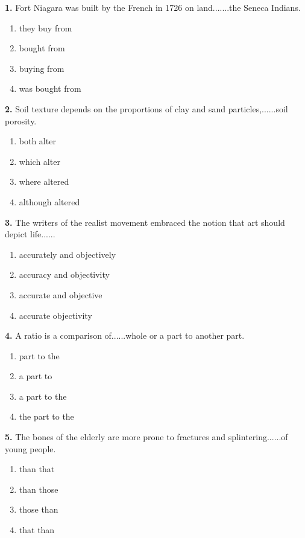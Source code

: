 \documentclass[12pt]{article}
\begin{document}
\noindent\textbf{1.} Fort Niagara was built by the French in 1726 on land.......the Seneca Indians.
\begin{enumerate}[label=(\Alph*),leftmargin=*,itemsep=0.2em]
\item they buy from
\item bought from
\item buying from
\item was bought from
\end{enumerate}
\par
\vspace{0.25\baselineskip}
\noindent\textbf{2.} Soil texture depends on the proportions of clay and sand particles,......soil porosity.
\begin{enumerate}[label=(\Alph*),leftmargin=*,itemsep=0.2em]
\item both alter
\item which alter
\item where altered
\item although altered
\end{enumerate}
\par
\vspace{0.25\baselineskip}
\noindent\textbf{3.} The writers of the realist movement embraced the notion that art should depict life......
\begin{enumerate}[label=(\Alph*),leftmargin=*,itemsep=0.2em]
\item accurately and objectively
\item accuracy and objectivity
\item accurate and objective
\item accurate objectivity
\end{enumerate}
\par
\vspace{0.25\baselineskip}
\noindent\textbf{4.} A ratio is a comparison of......whole or a part to another part.
\begin{enumerate}[label=(\Alph*),leftmargin=*,itemsep=0.2em]
\item part to the
\item a part to
\item a part to the
\item the part to the
\end{enumerate}
\par
\vspace{0.25\baselineskip}
\noindent\textbf{5.} The bones of the elderly are more prone to fractures and splintering......of young people.
\begin{enumerate}[label=(\Alph*),leftmargin=*,itemsep=0.2em]
\item than that
\item than those
\item those than
\item that than
\end{enumerate}
\end{document}
